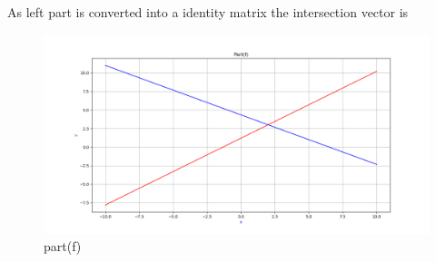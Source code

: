 \begin{enumerate}[label=\thesection.\arabic*.,ref=\thesection.\theenumi]
\begin{enumerate}
As left part is converted into a identity matrix the intersection vector is 

\renewcommand{\thefigure}{\theenumi.\arabic{figure}}
\begin{figure}[!ht]
    \centering
    \includegraphics[width=\columnwidth]{./figures/A1_partf}
\caption{part(f)}
\label{fig: part(f)}
\end{figure}

\end{enumerate}

\end{enumerate}



